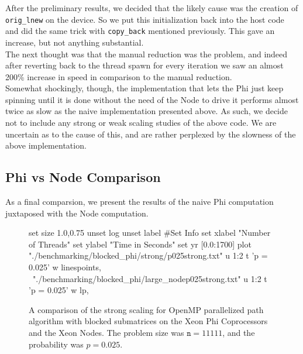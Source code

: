 \documentclass[11pt]{article}
\begin{document}
\noindent After the preliminary results, we decided that the likely cause was the creation of \texttt{orig\_lnew} on the device.  So we put this initialization back into the host code and did the same trick with \texttt{copy\_back} mentioned previously.  This gave an increase, but not anything substantial.\\

\noindent The next thought was that the manual reduction was the problem, and indeed after reverting back to the thread spawn for every iteration we saw an almost 200\% increase in speed in comparison to the manual reduction.\\

\noindent Somewhat shockingly, though, the implementation that lets the Phi just keep spinning until it is done without the need of the Node to drive it performs almost twice as slow as the naive implementation presented above.  As such, we decide not to include any strong or weak scaling studies of the above code.  We are uncertain as to the cause of this, and are rather perplexed by the slowness of the above implementation.

\subsection{Phi vs Node Comparison}

\noindent As a final comparsion, we present the results of the naive Phi computation juxtaposed with the Node computation.

\begin{figure}[h]
	\begin{center}
		\begin{gnuplot}[terminal=cairolatex, terminaloptions= color] 
			set size 1.0,0.75              
			unset log                          
			unset label                          
			#Set Info
			set xlabel "Number of Threads"
			set ylabel "Time in Seconds"
			set yr [0.0:1700]
			plot "./benchmarking/blocked_phi/strong/p025strong.txt" u 1:2 t 'p = 0.025' w linespoints, \
			"./benchmarking/blocked_phi/large_nodep025strong.txt" u 1:2 t 'p = 0.025' w lp, \
		\end{gnuplot}
		\caption{A comparison of the strong scaling for OpenMP parallelized path algorithm with blocked submatrices on the Xeon Phi Coprocessors and the Xeon Nodes. The problem size was $\mathtt{n} = 11111$, and the probability was $p = 0.025$.}
		\label{blocked_comparison}
	\end{center}
\end{figure}
\end{document}
